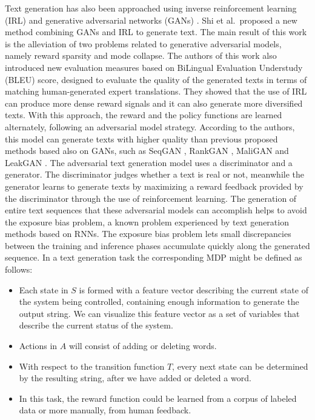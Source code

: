 Text generation has also been  approached using inverse reinforcement learning (IRL)  and generative adversarial networks (GANs) . Shi et al.\  proposed a new method combining GANs and IRL to generate text. The main result of this work is the alleviation of two problems related to generative adversarial models, namely reward sparsity and mode collapse. The authors of this work also introduced new evaluation measures based on BiLingual Evaluation Understudy (BLEU) score, designed to evaluate the quality of the generated texts in terms of matching human-generated expert translations. They showed that the use of IRL can produce more dense reward signals and it can also generate more diversified texts. With this approach, the reward and the policy functions are learned alternately, following an adversarial model strategy. According to the authors, this model can generate texts with higher quality than previous proposed methods based also on GANs, such as SeqGAN , RankGAN , MaliGAN  and LeakGAN . The adversarial text generation model uses  a discriminator and a generator. The discriminator judges whether a text is real or not, meanwhile the generator learns to generate texts by maximizing a reward feedback provided by the discriminator through the use of reinforcement learning. The generation of entire text sequences that these adversarial models can accomplish helps to avoid the exposure bias problem, a known problem experienced by text generation methods based on RNNs. The exposure bias problem  lets small discrepancies between the training and inference phases accumulate quickly along the generated sequence.
In a text generation task the corresponding MDP might be defined as follows:
\begin{itemize}
\item Each state in $S$ is formed with a feature vector describing the current state of the system being controlled, containing enough information to generate the output string. We can visualize this feature vector as a set of variables that describe the current status of the system.
\item Actions in $A$ will consist of adding or deleting words.
\item With respect to the transition function $T$, every next state can be determined by the resulting string, after we have added or deleted a word.
\item In this task, the reward function could be learned from a corpus of labeled data or more manually, from human feedback.
\end{itemize}
